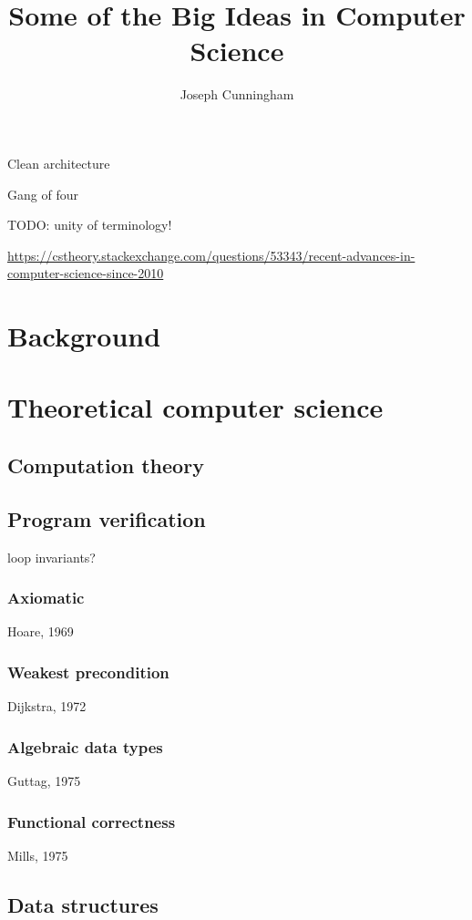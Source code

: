 \documentclass{report}
\title{Some of the Big Ideas in Computer Science}
\author{Joseph Cunningham}
\date{}
\begin{document}
\maketitle
\tableofcontents

Clean architecture

Gang of four

TODO: unity of terminology!

\url{https://cstheory.stackexchange.com/questions/53343/recent-advances-in-computer-science-since-2010}

\part{Background}
\setcounter{chapter}{0} %


\part{Theoretical computer science}
\setcounter{chapter}{0} %

\chapter{Computation theory}


\chapter{Program verification}
loop invariants?
\section{Axiomatic}
Hoare, 1969
\section{Weakest precondition}
Dijkstra, 1972
\section{Algebraic data types}
Guttag, 1975
\section{Functional correctness}
Mills, 1975

\chapter{Data structures}

\end{document}
